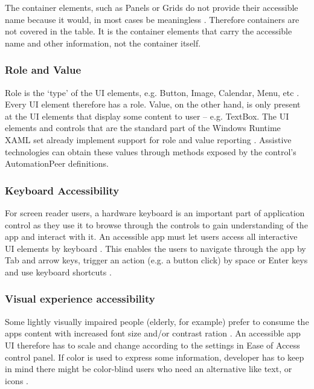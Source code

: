 
The container elements, such as Panels or Grids do not provide their accessible name because it would, in most cases be meaningless \cite{wp8guide}. Therefore containers are not covered in the table.
It is the container elements that carry the accessible name and other information, not the container itself.

\subsubsection{Role and Value}
Role is the ‘type’ of the UI elements, e.g. Button, Image, Calendar, Menu, etc \cite{wp8UIelementsAcc}. Every UI element therefore has a role. Value, on the other hand, is only present at the UI elements that display some content to user – e.g. TextBox. The UI elements and controls that are the standard part of the Windows Runtime XAML set already implement support for role and value reporting \cite{wp8UIelementsAcc}. Assistive technologies can obtain these values through methods exposed by the control's AutomationPeer definitions.


\subsubsection{Keyboard Accessibility}
For screen reader users, a hardware keyboard is an important part of application control as they use it to browse through the controls to gain understanding of the app and interact with it. An accessible app must let users access all interactive UI elements by keyboard \cite{wp8guide}. This enables the users to navigate through the app by Tab and arrow keys, trigger an action (e.g. a button click) by space or Enter keys and use keyboard shortcuts \cite{wp8guide}.

\subsubsection{Visual experience accessibility}
Some lightly visually impaired people (elderly, for example) prefer to consume the apps content with increased font size and/or contrast ration \cite{wp8guide}. An accessible app UI therefore has to scale and change according to the settings in Ease of Access control panel. If color is used to express some information, developer has to keep in mind there might be color-blind users who need an alternative like text, or icons \cite{wp8guide}.

